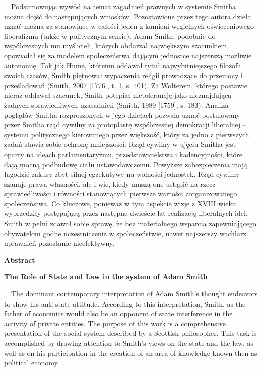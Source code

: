\documentclass[a4paper]{article}
\begin{document}
 \ \ Podsumowując wywód na temat zagadnień prawnych w systemie Smitha można dojść do następujących wniosków. Pozostawione przez tego autora dzieła uznać można za stanowiące w całości jeden z kamieni węgielnych oświeceniowego liberalizmu (także w politycznym sensie). Adam Smith, podobnie do współczesnych mu myślicieli, których obdarzał największym szacunkiem, opowiadał się za modelem społeczeństwa dającym jednostce najszerszą możliwie autonomię. Tak jak Hume, któremu oddawał tytuł najwybitniejszego filozofa swoich czasów, Smith piętnował wypaczenia religii prowadzące do przemocy i prześladowań \label{ref:RNDWdGETBWW27}(Smith, 2007 [1776], t. 1, s. 401). Za Wolterem, którego postawie nieraz oddawał szacunek, Smith potępiał nietolerancję jako nieznajdującą żadnych sprawiedliwych uzasadnień \label{ref:RNDcOFI1QT8Tr}(Smith, 1989 [1759], s. 183). Analiza poglądów Smitha rozproszonych w jego dziełach pozwala uznać postulowany przez Smitha rząd cywilny za protoplastę współczesnej demokracji liberalnej – systemu politycznego kierowanego przez większość, który za jedno z pierwszych zadań stawia sobie ochronę mniejszości. Rząd cywilny w ujęciu Smitha jest oparty na ideach parlamentaryzmu, przedstawicielstwa i kadencyjności, które dają mocną podbudowę ciału ustawodawczemu. Powyższe zabezpieczenia mają łagodzić zakusy zbyt silnej egzekutywy na wolności jednostek. Rząd cywilny szanuje prawa własności, ale i wie, kiedy muszą one ustąpić na rzecz sprawiedliwości i równości stanowiących pierwsze wartości zorganizowanego społeczeństwa. Co kluczowe, ponieważ w tym aspekcie wizje z XVIII wieku wyprzedziły postępującą przez następne dwieście lat realizację liberalnych idei, Smith w pełni zdawał sobie sprawę, że bez materialnego wsparcia zapewniającego obywatelom godne uczestniczenie w społeczeństwie, nawet najszerszy wachlarz uprawnień pozostanie nieefektywny.

{\bfseries
Abstract}

{\bfseries
The Role of State and Law in the system of Adam Smith}

\ \ The dominant contemporary interpretation of Adam Smith's thought endeavors to show his anti-state attitude. According to this interpretation, Smith, as the father of economics would also be an opponent of state interference in the activity of private entities. The purpose of this work is a comprehensive presentation of the social system described by a Scottish philosopher. This task is accomplished by drawing attention to Smith's views on the state and the law, as well as on his participation in the creation of an area of knowledge known then as political economy.
\end{document}
